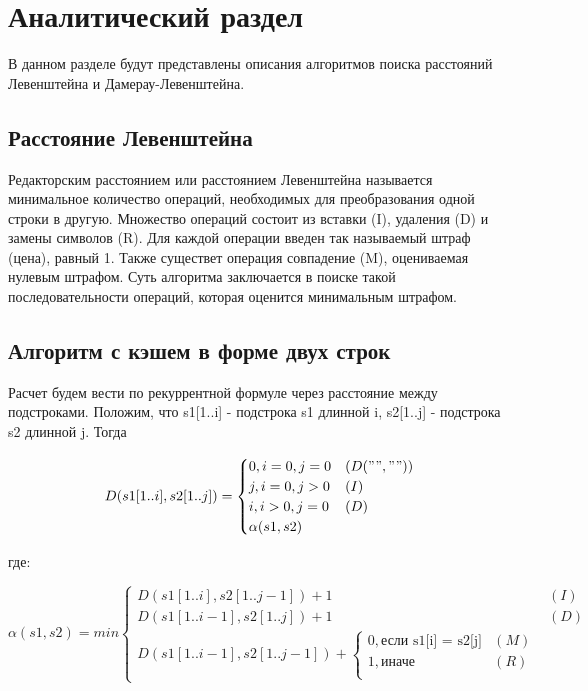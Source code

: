 \chapter{Аналитический раздел}

В данном разделе будут представлены описания алгоритмов поиска расстояний Левенштейна и Дамерау-Левенштейна.

\section{Расстояние Левенштейна}

Редакторским расстоянием или расстоянием Левенштейна \cite{Lev} называется минимальное количество операций, необходимых для преобразования одной строки в другую. Множество операций состоит из вставки (I), удаления (D) и замены символов (R). Для каждой операции введен так называемый штраф (цена), равный 1. Также существет операция совпадение (M), оцениваемая нулевым штрафом. Суть алгоритма заключается в поиске такой последовательности операций, которая оценится минимальным штрафом.

\section{Алгоритм с кэшем в форме двух строк}

Расчет будем вести по рекуррентной формуле через расстояние между подстроками. Положим, что s1[1..i] - подстрока s1 длинной i, s2[1..j] - подстрока s2 длинной j. Тогда

\begin{equation}
	D(s1[1..i], s2[1..j]) = 
	\begin{cases}
		0, i = 0, j = 0 & (D("",""))\\
		j, i = 0, j > 0 & (I)\\
		i, i > 0, j = 0 & (D)\\
		\alpha(s1, s2) \\
	\end{cases}
\end{equation}

где:

\begin{equation}
	\alpha(s1, s2) = min 
	\begin{cases}
		D(s1[1..i], s2[1..j - 1]) + 1 & (I) \\
		D(s1[1..i - 1], s2[1..j]) + 1 & (D) \\
		D(s1[1..i - 1], s2[1..j - 1]) + 
		\begin{cases}
			0, \text{если s1[i] = s2[j]} & (M) \\
			1, \text{иначе} & (R) \\
		\end{cases}
	\end{cases}
\end{equation}

